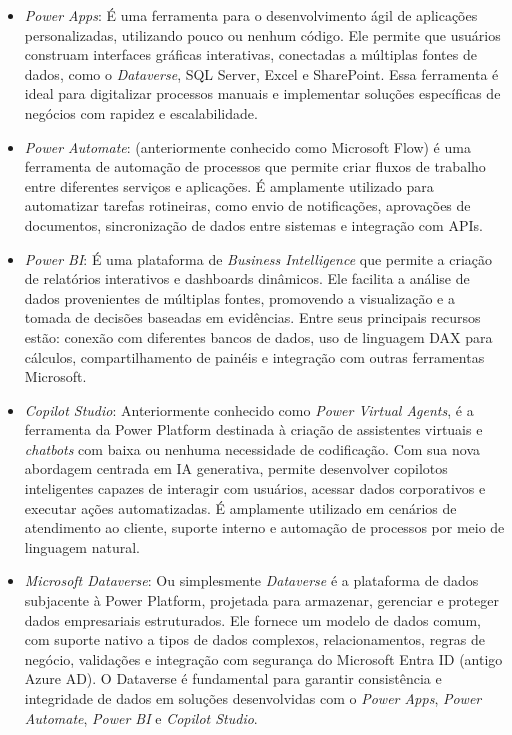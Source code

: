 	\begin{itemize}
		\item \textit{Power Apps}: É uma ferramenta para o desenvolvimento ágil de aplicações personalizadas, utilizando pouco ou nenhum código. Ele permite que usuários construam interfaces gráficas
		interativas, conectadas a múltiplas fontes de dados, como o \textit{Dataverse}, SQL Server, Excel e SharePoint. Essa ferramenta é ideal para digitalizar processos manuais e implementar
		soluções específicas de negócios com rapidez e escalabilidade.

		\item \textit{Power Automate}: (anteriormente conhecido como Microsoft Flow) é uma ferramenta de automação de processos que permite criar fluxos de trabalho entre diferentes serviços e
		aplicações. É amplamente utilizado para automatizar tarefas rotineiras, como envio de notificações, aprovações de documentos, sincronização de dados entre sistemas e integração com APIs.

		\item \textit{Power BI}: É uma plataforma de \textit{Business Intelligence} que permite a criação de relatórios interativos e dashboards dinâmicos. Ele facilita a análise de dados provenientes
		de múltiplas fontes, promovendo a visualização e a tomada de decisões baseadas em evidências. Entre seus principais recursos estão: conexão com diferentes bancos de dados, uso de linguagem
		DAX para cálculos, compartilhamento de painéis e integração com outras ferramentas Microsoft.

		\item \textit{Copilot Studio}: Anteriormente conhecido como \textit{Power Virtual Agents}, é a ferramenta da Power Platform destinada à criação de assistentes virtuais e \textit{chatbots} com
		baixa ou nenhuma necessidade de codificação. Com sua nova abordagem centrada em IA generativa, permite desenvolver copilotos inteligentes capazes de interagir com usuários, acessar dados
		corporativos e executar ações automatizadas. É amplamente utilizado em cenários de atendimento ao cliente, suporte interno e automação de processos por meio de linguagem natural.

		\item \textit{Microsoft Dataverse}: Ou simplesmente \textit{Dataverse} é a plataforma de dados subjacente à Power Platform, projetada para armazenar, gerenciar e proteger dados empresariais estruturados. Ele fornece um modelo de
		dados comum, com suporte nativo a tipos de dados complexos, relacionamentos, regras de negócio, validações e integração com segurança do Microsoft Entra ID (antigo Azure AD). O Dataverse é
		fundamental para garantir consistência e integridade de dados em soluções desenvolvidas com o \textit{Power Apps}, \textit{Power Automate}, \textit{Power BI} e \textit{Copilot Studio}.
	\end{itemize}
	
